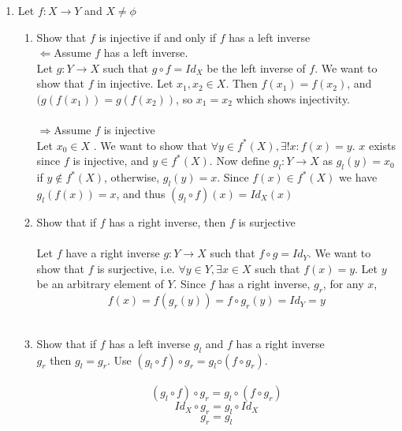 \documentclass[11pt]{article}
\begin{document}
\begin{enumerate}
\item Let $f:X \to Y$ and $X \neq \phi$
\begin{enumerate}
\item Show that $f$ is injective if and only if $f$ has a left inverse\\
$\Leftarrow$Assume $f$ has a left inverse.\\
Let $g : Y \to X$ such that $g \circ f = Id_X$ be the left inverse of $f$.  We want to show that $f$ in injective.  Let $x_1, x_2 \in X$.  Then $f(x_1) = f(x_2)$, and $(g(f(x_1)) = g(f(x_2))$, so $x_1 = x_2$ which shows injectivity.\\\\
$\Rightarrow$Assume $f$ is injective\\
Let $x_0 \in X$ .  We want to show that $\forall y \in f^*(X), \exists! x:f(x) = y.$  $x$ exists since $f$ is injective, and $y \in f^*(X)$.  Now define $g_l : Y \to X$ as $g_l(y) = x_0$ if $y \notin f^*(X)$, otherwise, $g_l(y) = x$.  Since $f(x) \in f^*(X)$ we have $g_l(f(x)) = x$, and thus $(g_l \circ f)(x) = Id_X(x)$
\item Show that if $f$ has a right inverse, then $f$ is surjective\\\\
Let $f$ have a right inverse $g : Y \to X$ such that  $f \circ g = Id_Y$.  We want to show that $f$ is surjective, i.e. $\forall y \in Y, \exists x \in X$ such that $f(x) = y$.  Let $y$ be an arbitrary element of $Y$.  Since $f$ has a right inverse, $g_r$, for any $x$,
$$f(x) = f(g_r(y)) = f \circ g_r(y) = Id_Y = y$$
\\
\item Show that if $f$ has a left inverse $g_l$ and $f$ has a right inverse\\
$g_r$ then $g_l = g_r$. Use $(g_l \circ f) \circ g_r = g_l ◦ (f \circ g_r )$.\\
\\
$$(g_l \circ f) \circ g_r = g_l \circ (f \circ g_r)$$
$$Id_X \circ g_r = g_l \circ Id_X$$
$$g_r = g_l$$
\end{enumerate} %


\end{enumerate}
\end{document}
